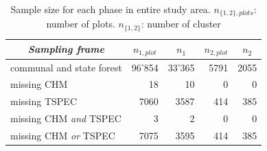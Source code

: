 \begin{table}[H]
	\begin{center}
		\caption{Sample size for each phase in entire study area. $n_{\{1,2\},plots}$: number of plots. $n_{\{1,2\}}$: number of cluster}
		\vspace{0.2cm}
		\label{tab:ssize}
		{\small %
			\begin{tabular}{l|r|r|r|r}
				\hline
				\multicolumn{1}{c|}{\textit{Sampling frame}} & \multicolumn{1}{c|}{\textbf{$n_{1,plot}$}}  & \multicolumn{1}{c|}{\textbf{$n_1$}}  & \multicolumn{1}{c|}{\textbf{$n_{2,plot}$}}  & \multicolumn{1}{c}{\textbf{$n_2$}} \\ %
				\hline \hline
				communal and state forest & 96'854 & 33'365 & 5791 & 2055\\
				\hspace{5mm} \footnotesize missing CHM & \footnotesize 18 & \footnotesize 10 & \footnotesize 0 & \footnotesize 0\\ %
				\hspace{5mm} \footnotesize missing TSPEC & \footnotesize 7060  & \footnotesize 3587 & \footnotesize 414 & \footnotesize 385\\ %
				\hspace{5mm} \footnotesize missing CHM \textit{and} TSPEC & \footnotesize 3 & \footnotesize 2 & \footnotesize 0 & \footnotesize 0\\ %
				\hspace{5mm} \footnotesize missing CHM \textit{or} TSPEC & \footnotesize 7075 & \footnotesize 3595 & \footnotesize 414 & \footnotesize 385\\ %
				\hline \hline
			\end{tabular}
		} %
	\end{center}
\end{table}


